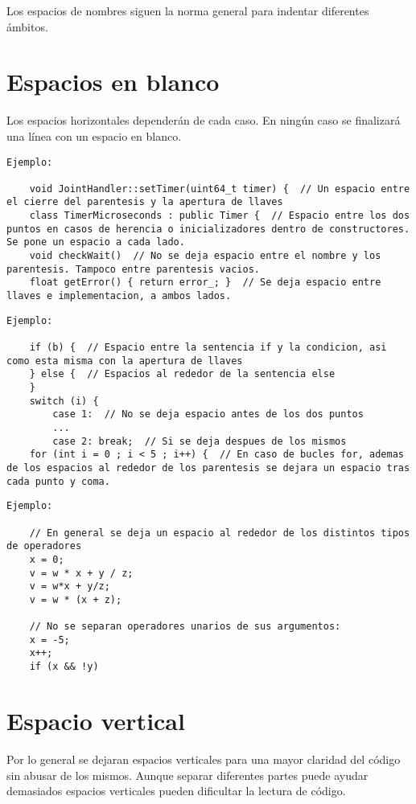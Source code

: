 
Los espacios de nombres siguen la norma general para indentar diferentes ámbitos.

\section{Espacios en blanco}\label{sec:codificacionSW:espacios_blanco}

Los espacios horizontales dependerán de cada caso. En ningún caso se finalizará una línea con un espacio en blanco.


    \lstset{language=C, breaklines=true, basicstyle=\footnotesize}
    \begin{lstlisting}[frame=single]
Ejemplo: 

    void JointHandler::setTimer(uint64_t timer) {  // Un espacio entre el cierre del parentesis y la apertura de llaves
    class TimerMicroseconds : public Timer {  // Espacio entre los dos puntos en casos de herencia o inicializadores dentro de constructores. Se pone un espacio a cada lado.
    void checkWait()  // No se deja espacio entre el nombre y los parentesis. Tampoco entre parentesis vacios.
    float getError() { return error_; }  // Se deja espacio entre llaves e implementacion, a ambos lados.

    \end{lstlisting}


    \lstset{language=C, breaklines=true, basicstyle=\footnotesize}
    \begin{lstlisting}[frame=single]
Ejemplo: 

    if (b) {  // Espacio entre la sentencia if y la condicion, asi como esta misma con la apertura de llaves
    } else {  // Espacios al rededor de la sentencia else
    }
    switch (i) {
        case 1:  // No se deja espacio antes de los dos puntos
        ...
        case 2: break;  // Si se deja despues de los mismos
    for (int i = 0 ; i < 5 ; i++) {  // En caso de bucles for, ademas de los espacios al rededor de los parentesis se dejara un espacio tras cada punto y coma.
    \end{lstlisting}
    

    \lstset{language=C, breaklines=true, basicstyle=\footnotesize}
    \begin{lstlisting}[frame=single]
Ejemplo: 

    // En general se deja un espacio al rededor de los distintos tipos de operadores
    x = 0;
    v = w * x + y / z;
    v = w*x + y/z;
    v = w * (x + z);
    
    // No se separan operadores unarios de sus argumentos:
    x = -5;
    x++;
    if (x && !y)

    \end{lstlisting}
    

\section{Espacio vertical}

Por lo general se dejaran espacios verticales para una mayor claridad del código sin abusar de los mismos. Aunque separar diferentes partes puede ayudar demasiados espacios verticales pueden dificultar la lectura de código.
